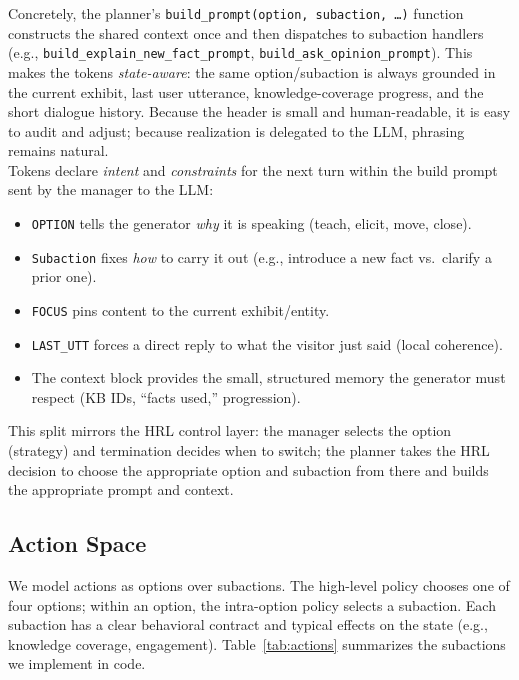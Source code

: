 \documentclass[12pt]{article}
\begin{document}
Concretely, the planner’s \texttt{build\_prompt(option, subaction, \dots)} function constructs the shared context once and then dispatches to subaction handlers (e.g., \texttt{build\_explain\_new\_fact\_prompt}, \texttt{build\_ask\_opinion\_prompt}). This makes the tokens \emph{state-aware}: the same option/subaction is always grounded in the current exhibit, last user utterance, knowledge-coverage progress, and the short dialogue history. Because the header is small and human-readable, it is easy to audit and adjust; because realization is delegated to the LLM, phrasing remains natural.\\

Tokens declare \emph{intent} and \emph{constraints} for the next turn within the build prompt sent by the manager to the LLM:\\

\begin{itemize}[nosep,leftmargin=1.2em]
  \item \texttt{OPTION} tells the generator \emph{why} it is speaking (teach, elicit, move, close).
  \item \texttt{Subaction} fixes \emph{how} to carry it out (e.g., introduce a new fact vs.\ clarify a prior one).
  \item \texttt{FOCUS} pins content to the current exhibit/entity.
  \item \texttt{LAST\_UTT} forces a direct reply to what the visitor just said (local coherence).
  \item The context block provides the small, structured memory the generator must respect (KB IDs, “facts used,” progression).
\end{itemize}

This split mirrors the HRL control layer: the manager selects the option (strategy) and termination decides when to switch; the planner takes the HRL decision to choose the appropriate option and subaction from there and builds the appropriate prompt and context. 

\subsection{Action Space}
\label{sec:action-space}

We model actions as options over subactions. The high-level policy chooses one of four options; within an option, the intra-option policy selects a subaction. Each subaction has a clear behavioral contract and typical effects on the state (e.g., knowledge coverage, engagement). Table~\ref{tab:actions} summarizes the subactions we implement in code.
\end{document}
